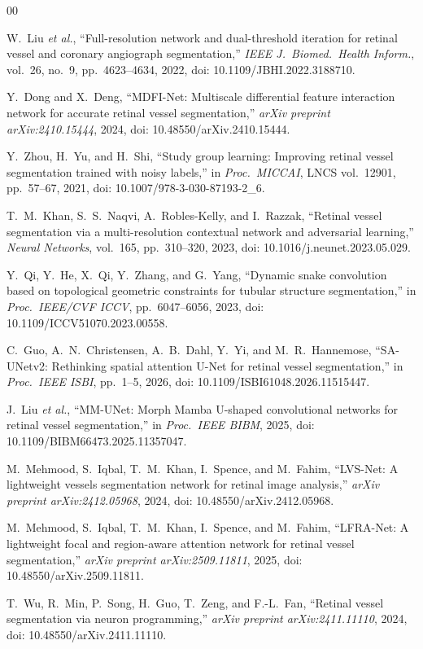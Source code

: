 \documentclass[conference]{IEEEtran}
\begin{document}
\begin{thebibliography}{00}

W.~Liu \textit{et al.},
``Full-resolution network and dual-threshold iteration for retinal vessel and
coronary angiograph segmentation,''
\textit{IEEE J.\ Biomed.\ Health Inform.}, vol.~26, no.~9, pp.~4623--4634,
2022, doi: 10.1109/JBHI.2022.3188710.

Y.~Dong and X.~Deng,
``MDFI-Net: Multiscale differential feature interaction network for accurate
retinal vessel segmentation,''
\textit{arXiv preprint arXiv:2410.15444}, 2024,
doi: 10.48550/arXiv.2410.15444.

Y.~Zhou, H.~Yu, and H.~Shi,
``Study group learning: Improving retinal vessel segmentation trained with
noisy labels,''
in \textit{Proc.\ MICCAI}, LNCS vol.~12901, pp.~57--67, 2021,
doi: 10.1007/978-3-030-87193-2\_6.

T.~M.~Khan, S.~S.~Naqvi, A.~Robles-Kelly, and I.~Razzak,
``Retinal vessel segmentation via a multi-resolution contextual network and
adversarial learning,''
\textit{Neural Networks}, vol.~165, pp.~310--320, 2023,
doi: 10.1016/j.neunet.2023.05.029.

Y.~Qi, Y.~He, X.~Qi, Y.~Zhang, and G.~Yang,
``Dynamic snake convolution based on topological geometric constraints for
tubular structure segmentation,''
in \textit{Proc.\ IEEE/CVF ICCV}, pp.~6047--6056, 2023,
doi: 10.1109/ICCV51070.2023.00558.

C.~Guo, A.~N.~Christensen, A.~B.~Dahl, Y.~Yi, and M.~R.~Hannemose,
``SA-UNetv2: Rethinking spatial attention U-Net for retinal vessel
segmentation,''
in \textit{Proc.\ IEEE ISBI}, pp.~1--5, 2026,
doi: 10.1109/ISBI61048.2026.11515447.

J.~Liu \textit{et al.},
``MM-UNet: Morph Mamba U-shaped convolutional networks for retinal vessel
segmentation,''
in \textit{Proc.\ IEEE BIBM}, 2025, doi: 10.1109/BIBM66473.2025.11357047.

M.~Mehmood, S.~Iqbal, T.~M.~Khan, I.~Spence, and M.~Fahim,
``LVS-Net: A lightweight vessels segmentation network for retinal image
analysis,''
\textit{arXiv preprint arXiv:2412.05968}, 2024,
doi: 10.48550/arXiv.2412.05968.

M.~Mehmood, S.~Iqbal, T.~M.~Khan, I.~Spence, and M.~Fahim,
``LFRA-Net: A lightweight focal and region-aware attention network for retinal
vessel segmentation,''
\textit{arXiv preprint arXiv:2509.11811}, 2025,
doi: 10.48550/arXiv.2509.11811.

T.~Wu, R.~Min, P.~Song, H.~Guo, T.~Zeng, and F.-L.~Fan,
``Retinal vessel segmentation via neuron programming,''
\textit{arXiv preprint arXiv:2411.11110}, 2024,
doi: 10.48550/arXiv.2411.11110.

\end{thebibliography}
\end{document}
